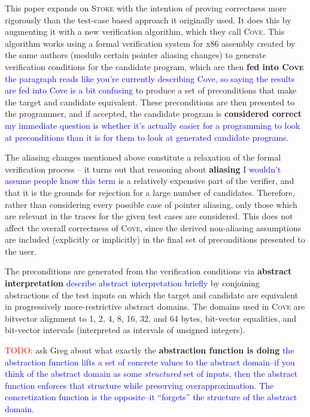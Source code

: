 \documentclass[12pt,twoside]{reedthesis}
\newcommand{\red}[1]{\textcolor{red}{#1}}
\newcommand{\comment}[2]{\textbf{#1} \textcolor{blue}{#2}}
\begin{document}
This paper expands on \textsc{Stoke} with the intention of proving correctness more rigorously than the test-case based approach it originally used.
It does this by augmenting it with a new verification algorithm, which they call \textsc{Cove}.
This algorithm works using a formal verification system for x86 assembly created by the same authors \cite{sharma2013ddec} (modulo certain pointer aliasing changes) to generate verification conditions for the candidate program, which are then
    \comment{fed into \textsc{Cove}}{the paragraph reads like you're currently describing Cove, so saying the results are fed into Cove is a bit confusing}
    to produce a set of preconditions that make the target and candidate equivalent.
These preconditions are then presented to the programmer, and if accepted, the candidate program is
    \comment{considered correct}{my immediate question is whether it's actually easier for a programming to look at preconditions than it is for them to look at generated candidate programs}.
    
The aliasing changes mentioned above constitute a relaxation of the formal verification process -- it turns out that reasoning about
    \comment{aliasing}{I wouldn't assume people know this term}
    is a relatively expensive part of the verifier, and that it is the grounds for rejection for a large number of candidates.
Therefore, rather than considering every possible case of pointer aliasing, only those which are relevant in the traces for the given test cases are considered.
This does not affect the overall correctness of \textsc{Cove}, since the derived non-aliasing assumptions are included (explicitly or implicitly) in the final set of preconditions presented to the user.
    
The preconditions are generated from the verification conditions via
    \comment{abstract interpretation}{describe abstract interpretation briefly}
    by conjoining abstractions of the test inputs on which the target and candidate are equivalent in progressively more-restrictive abstract domains.
The domains used in \textsc{Cove} are bitvector alignment to 1, 2, 4, 8, 16, 32, and 64 bytes, bit-vector equalities, and bit-vector intervals (interpreted as intervals of unsigned integers).
    
\red{TODO:} ask Greg about what exactly the \comment{abstraction function is doing}{the abstraction function lifts a set of concrete values to the abstract domain--if you think of the abstract domain as some \emph{structured} set of inputs, then the abstract function enforces that structure while preserving overapproximation. The concretization function is the opposite--it ``forgets'' the structure of the abstract domain.}
    
\end{document}
